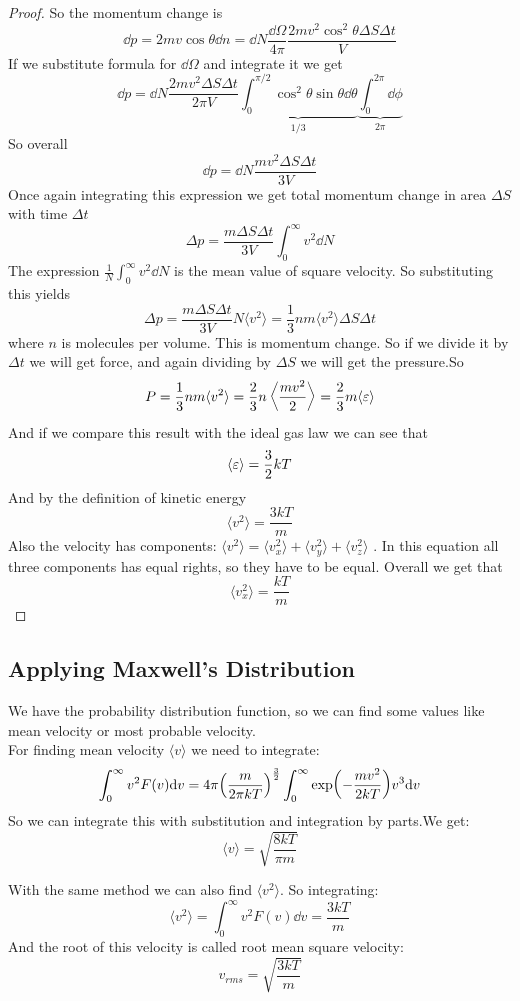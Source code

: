 \documentclass[a4paper, 12pt]{article}
\begin{document}
\begin{proof}
    So the momentum change is $$\dd p=2mv\cos\theta \dd n=\dd N\frac{\dd \Omega}{4\pi}\frac{2mv^2\cos^2\theta\Delta S\Delta t}{V}$$
    If we substitute formula for $\dd \Omega$ and integrate it we get $$\dd p=\dd N\frac{2mv^2 \Delta S\Delta t}{2\pi V}\underbrace{\int_0^{\pi/2}\cos^2\theta\sin\theta\dd\theta}_{1/3} \underbrace{\int_0^{2\pi}\dd \phi}_{2\pi}$$
    So overall $$\dd p=\dd N \frac{mv^2 \Delta S\Delta t}{3V}$$Once again integrating this expression we get total momentum change in area $\Delta S$ with time $\Delta t$
    $$\Delta p=\frac{m\Delta S\Delta t}{3V}\int_{0}^{\infty}v^2\dd N$$
    The expression $\frac{1}{N}\int_{0}^{\infty}v^2\dd N$ is the mean value of square velocity. So substituting this yields
    $$\Delta p=\frac{m\Delta S\Delta t}{3V}N\langle v^2\rangle=\frac{1}{3}nm\langle v^2\rangle\Delta S\Delta t$$
    where $n$ is molecules per volume. This is momentum change. So if we divide it by $\Delta t$ we will get  force, and again dividing by $\Delta S$ we will get the pressure.So
    $$P = \frac{1}{3}nm\langle v^2\rangle=\frac{2}{3}n\left<\frac{mv^2}{2}\right>=\frac{2}{3}m\langle \varepsilon \rangle$$
    And if we compare this result with the ideal gas law we can see that $$\langle \varepsilon \rangle=\frac{3}{2}kT$$
    And by the definition of kinetic energy $$\langle v^2\rangle=\frac{3kT}{m}$$ Also the velocity has components: $\langle v^2\rangle = \langle v_x^2\rangle+\langle v_y^2\rangle+\langle v_z^2\rangle$
    . In this equation all three components has equal rights, so they have to be equal. Overall we get that $$\langle v_x^2\rangle=\frac{kT}{m}$$
\end{proof}

\subsection{Applying Maxwell's Distribution}
We have the probability distribution function, so we can find some values like mean velocity or most probable velocity.\\
For finding mean velocity $\langle v\rangle$ we  need to integrate:
\begin{equation}\label{eq:meanv}
    \int_0^\infty  v^2F(v)\dd v=4\pi \qty(\frac{m}{2\pi kT})^{\frac{3}{2}}\int_0^\infty\exp(-\frac{mv^2}{2kT})v^3\dd v
\end{equation}
So we can integrate this with substitution and integration by parts.We get:
$$\langle v\rangle=\sqrt{\frac{8kT}{\pi m}}$$

With the same method we can also find $\langle v^2 \rangle$. So integrating:
$$\langle v^2 \rangle=\int_0^\infty v^2 F(v)\dd v=\frac{3kT}{m}$$
And the root of this velocity is called root mean square velocity:$$v_{rms}=\sqrt{\frac{3kT}{m}}$$
\end{document}
